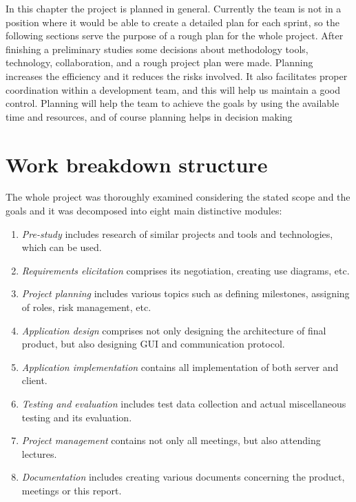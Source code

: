 In this chapter the project is planned in general. Currently the team is not in a position where it would be able to create a detailed plan for each sprint, so the following sections serve the purpose of a rough plan for the whole project. After finishing a preliminary studies some decisions about methodology tools, technology, collaboration, and a rough project plan were made. Planning increases the efficiency and it reduces the risks involved. It also facilitates proper coordination within a development team, and this will help us maintain a good control. Planning will help the team to achieve the goals by using the available time and resources, and of course planning helps in decision making  

\section{Work breakdown structure}
\label{sec:wbs}
The whole project was thoroughly examined considering the stated scope and the goals and it was decomposed into eight main distinctive modules:

\begin{enumerate}
\item  \label{wbs_prestudy} \emph{Pre-study} includes research of similar projects and tools and technologies, which can be used.
\item \label{wbs_requirements}\emph{Requirements elicitation} comprises its negotiation, creating use diagrams, etc.
\item \label{wbs_planning}\emph{Project planning} includes various topics such as defining milestones, assigning of roles, risk management, etc.
\item \label{wbs_design}\emph{Application design} comprises not only designing the architecture of final product, but also designing GUI and communication protocol.
\item \label{wbs_implementation}\emph{Application implementation} contains all implementation of both server and client.
\item \label{wbs_testing}\emph{Testing and evaluation} includes test data collection and actual miscellaneous testing and its evaluation.
\item \label{wbs_project_management}\emph{Project management} contains not only all meetings, but also attending lectures.
\item \label{wbs_documentation} \emph{Documentation} includes creating various documents concerning the product, meetings or this report.
\end{enumerate}


